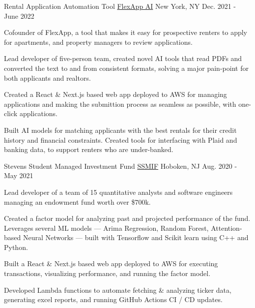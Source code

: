 

\begin{cventries}

  \cventry
  {Rental Application Automation Tool} %
  {\href{https://flexapp.ai}{FlexApp AI}} %
  {New York, NY} %
  {Dec. 2021 - June 2022} %
  {
    \begin{cvitems} %
      \item {Cofounder of FlexApp, a tool that makes it easy for prospective renters to apply for apartments, and property managers to review applications.}
      \item {Lead developer of five-person team, created novel AI tools that read PDFs and converted the text to and from consistent formats, solving a major pain-point for both applicants and realtors.}
      \item {Created a React \& Next.js based web app deployed to AWS for managing applications and making the submittion process as seamless as possible, with one-click applications.}
      \item {Built AI models for matching applicants with the best rentals for their credit history and financial constraints. Created tools for interfacing with Plaid and banking data, to support renters who are under-banked.}
    \end{cvitems}
  }

  \cventry
  {Stevens Student Managed Investment Fund} %
  {\href{https://bailey.ssmif.com}{SSMIF}} %
  {Hoboken, NJ} %
  {Aug. 2020 - May 2021} %
  {
    \begin{cvitems} %
      \item {Lead developer of a team of 15 quantitative analysts and software engineers managing an endowment fund worth over \$700k.}
      \item {Created a factor model for analyzing past and projected performance of the fund. Leverages several ML models --- Arima Regression, Random Forest, Attention-based Neural Networks --- built with Tensorflow and Scikit learn using C++ and Python.}
      \item {Built a React \& Next.js based web app deployed to AWS for executing transactions, visualizing performance, and running the factor model.}
      \item {Developed Lambda functions to automate fetching \& analyzing ticker data, generating excel reports, and running GitHub Actions CI / CD updates.}
    \end{cvitems}
  }


\end{cventries}
